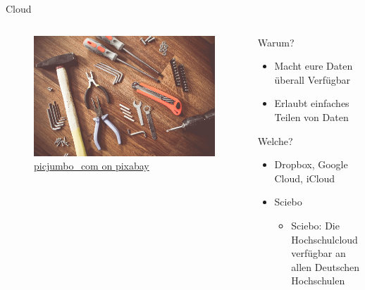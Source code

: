 \documentclass[aspectratio=169,shownotes]{beamer}
\begin{document}
\begin{frame}[t]{Cloud}
    \begin{columns}[t]   
        \begin{column}{0.29\textwidth}      
            \vspace{-3em}      
            \begin{figure}[t]
                \begin{flushleft}
                    \includegraphics[height=0.8\textheight,trim={0 0 25cm 0},clip]{graphics/tools-864983_1280.jpg}         
                    \caption*{\href{https://pixabay.com/de/photos/werkzeuge-konstruieren-boot-864983/}{picjumbo\_com on pixabay}}    
                \end{flushleft}                
            \end{figure}
        \end{column} 
        \begin{column}{0.7\textwidth}
            Warum?
            \begin{itemize}[]
                \item Macht eure Daten überall Verfügbar
                \item Erlaubt einfaches Teilen von Daten
            \end{itemize}
            Welche?
            \begin{itemize}[]
                \item Dropbox, Google Cloud, iCloud
                \item Sciebo
                \begin{itemize}
                    \item Sciebo: Die Hochschulcloud verfügbar an allen Deutschen Hochschulen

\end{itemize}
\end{itemize}
\end{column}
\end{columns}
\end{frame}
\end{document}

